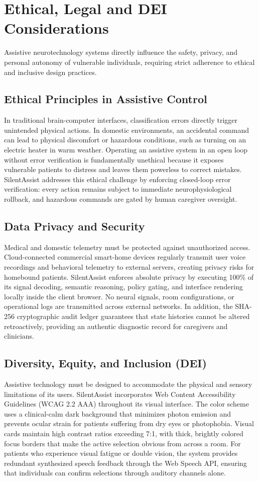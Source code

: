 \documentclass[12pt,a4paper]{report}
\begin{document}
\section{Ethical, Legal and DEI Considerations}
Assistive neurotechnology systems directly influence the safety, privacy, and personal autonomy of vulnerable individuals, requiring strict adherence to ethical and inclusive design practices.

\subsection{Ethical Principles in Assistive Control}
In traditional brain-computer interfaces, classification errors directly trigger unintended physical actions. In domestic environments, an accidental command can lead to physical discomfort or hazardous conditions, such as turning on an electric heater in warm weather. Operating an assistive system in an open loop without error verification is fundamentally unethical because it exposes vulnerable patients to distress and leaves them powerless to correct mistakes. SilentAssist addresses this ethical challenge by enforcing closed-loop error verification: every action remains subject to immediate neurophysiological rollback, and hazardous commands are gated by human caregiver oversight.

\subsection{Data Privacy and Security}
Medical and domestic telemetry must be protected against unauthorized access. Cloud-connected commercial smart-home devices regularly transmit user voice recordings and behavioral telemetry to external servers, creating privacy risks for homebound patients. SilentAssist enforces absolute privacy by executing 100\% of its signal decoding, semantic reasoning, policy gating, and interface rendering locally inside the client browser. No neural signals, room configurations, or operational logs are transmitted across external networks. In addition, the SHA-256 cryptographic audit ledger guarantees that state histories cannot be altered retroactively, providing an authentic diagnostic record for caregivers and clinicians.

\subsection{Diversity, Equity, and Inclusion (DEI)}
Assistive technology must be designed to accommodate the physical and sensory limitations of its users. SilentAssist incorporates Web Content Accessibility Guidelines (WCAG 2.2 AAA) throughout its visual interface. The color scheme uses a clinical-calm dark background that minimizes photon emission and prevents ocular strain for patients suffering from dry eyes or photophobia. Visual cards maintain high contrast ratios exceeding 7:1, with thick, brightly colored focus borders that make the active selection obvious from across a room. For patients who experience visual fatigue or double vision, the system provides redundant synthesized speech feedback through the Web Speech API, ensuring that individuals can confirm selections through auditory channels alone.
\end{document}
